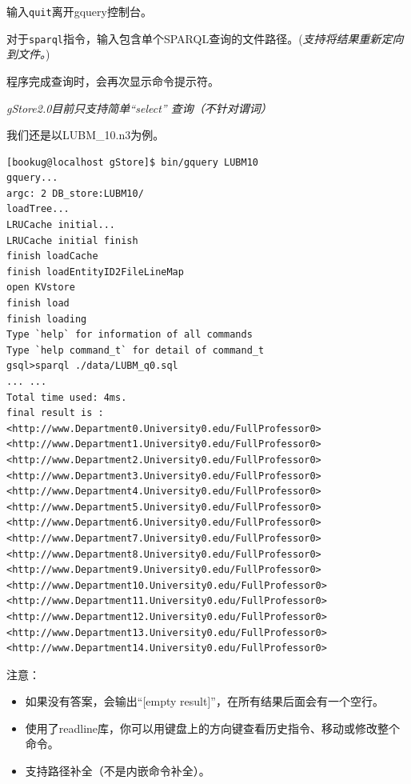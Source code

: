\documentclass[titlepage, a4paper, 12pt]{article}
\begin{document}
输入\texttt{quit}离开gquery控制台。

对于\texttt{sparql}指令，输入包含单个SPARQL查询的文件路径。(\emph{支持将结果重新定向到文件。})

程序完成查询时，会再次显示命令提示符。

\emph{gStore2.0目前只支持简单``select'' 查询（不针对谓词）}

我们还是以LUBM\_10.n3为例。

\begin{verbatim}
[bookug@localhost gStore]$ bin/gquery LUBM10
gquery...
argc: 2 DB_store:LUBM10/
loadTree...
LRUCache initial...
LRUCache initial finish
finish loadCache
finish loadEntityID2FileLineMap
open KVstore
finish load
finish loading
Type `help` for information of all commands
Type `help command_t` for detail of command_t
gsql>sparql ./data/LUBM_q0.sql
... ...
Total time used: 4ms.
final result is :
<http://www.Department0.University0.edu/FullProfessor0>
<http://www.Department1.University0.edu/FullProfessor0>
<http://www.Department2.University0.edu/FullProfessor0>
<http://www.Department3.University0.edu/FullProfessor0>
<http://www.Department4.University0.edu/FullProfessor0>
<http://www.Department5.University0.edu/FullProfessor0>
<http://www.Department6.University0.edu/FullProfessor0>
<http://www.Department7.University0.edu/FullProfessor0>
<http://www.Department8.University0.edu/FullProfessor0>
<http://www.Department9.University0.edu/FullProfessor0>
<http://www.Department10.University0.edu/FullProfessor0>
<http://www.Department11.University0.edu/FullProfessor0>
<http://www.Department12.University0.edu/FullProfessor0>
<http://www.Department13.University0.edu/FullProfessor0>
<http://www.Department14.University0.edu/FullProfessor0>
\end{verbatim}

注意：

\begin{itemize}
	\item
	如果没有答案，会输出``{[}empty result{]}''，在所有结果后面会有一个空行。
	\item
	使用了readline库，你可以用键盘上的方向键查看历史指令、移动或修改整个命令。
	\item
	支持路径补全（不是内嵌命令补全）。
\end{itemize}

\end{document}
